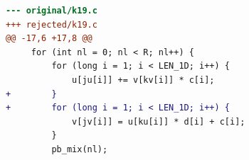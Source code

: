 \begin{lstlisting}[language=diff,basicstyle=\ttfamily\scriptsize,breaklines=true,caption={tsvc_b1/k19 — attempt 1 of 3, rejected by the gate at 'correctness': Program output changed — the patched program is NOT semantically equivalent to the original. / output differs and no numerical slack is in effect}]
--- original/k19.c
+++ rejected/k19.c
@@ -17,6 +17,8 @@
     for (int nl = 0; nl < R; nl++) {
         for (long i = 1; i < LEN_1D; i++) {
             u[ju[i]] += v[kv[i]] * c[i];
+        }
+        for (long i = 1; i < LEN_1D; i++) {
             v[jv[i]] = u[ku[i]] * d[i] + c[i];
         }
         pb_mix(nl);
\end{lstlisting}
